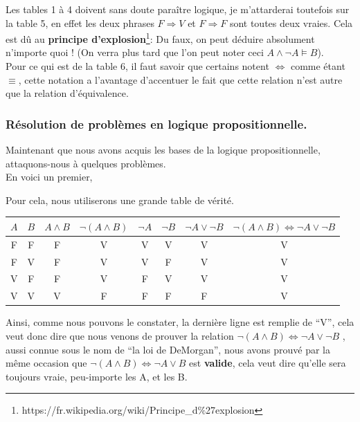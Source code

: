 \documentclass[a4paper, 12pt]{article}
\newcommand{\ffi}{\Leftrightarrow}
\newcommand{\imply}{\Rightarrow}
\numberwithin{equation}{subsection}
\begin{document}
  Les tables 1 à 4 doivent sans doute paraître logique, je m'attarderai toutefois sur la table 5, en effet les deux phrases $F \imply V$ et $F \imply F$ sont toutes deux vraies.
  Cela est dû au {\bf principe d'explosion}\footnote{https://fr.wikipedia.org/wiki/Principe\_d$\%$27explosion}: Du faux, on peut déduire absolument n'importe quoi ! (On verra plus tard que l'on peut noter ceci $A \land \neg A \models B$).\\

  Pour ce qui est de la table 6, il faut savoir que certains notent $\ffi$ comme étant $\equiv$, cette notation a l'avantage d'accentuer le fait que cette relation n'est autre que la relation d'équivalence.
  \subsubsection{Résolution de problèmes en logique propositionnelle.}
  Maintenant que nous avons acquis les bases de la logique propositionnelle,  attaquons-nous à quelques problèmes.\\

  En voici un premier,
  \begin{center}
    \Ovalbox{$ \neg (A \land B ) \ffi \neg A \lor \neg B$}
  \end{center}
  Pour cela, nous utiliserons une grande table de vérité.
  \begin{table}[H]
    \centering
    \begin{tabular}{|c|c|c|c|c|c|c|c|}
      \hline $A$ & $B$ & $A \land B$ & $\neg (A \land B)$ & $\neg A$ & $\neg B$ & $\neg A \lor \neg B$ & $\neg (A \land B) \ffi \neg A \lor \neg B$ \\
      \hline  F  &  F  &      F      &          V         &     V    &     V    &          V           &                     V                      \\
              F  &  V  &      F      &          V         &     V    &     F    &          V           &                     V                      \\
              V  &  F  &      F      &          V         &     F    &     V    &          V           &                     V                      \\
              V  &  V  &      V      &          F         &     F    &     F    &          F           &                     V                      \\
      \hline
    \end{tabular}
  \end{table}
  Ainsi, comme nous pouvons le constater, la dernière ligne est remplie de ``V'', cela veut donc dire que nous venons de prouver la relation $\neg (A \land B) \ffi \neg A \lor \neg B$ , aussi connue sous le nom de ``la loi de DeMorgan'', nous avons prouvé par la même occasion que $\neg (A \land B) \ffi \neg A \lor B$ est {\bf valide}, cela veut dire qu'elle sera toujours vraie, peu-importe les A, et les B.\\
\end{document}
